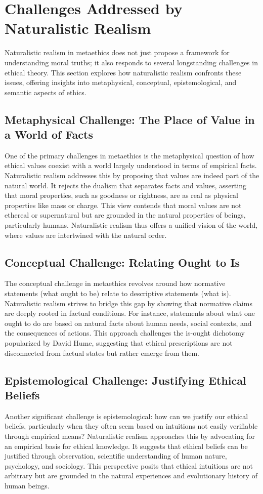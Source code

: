 \documentclass[12pt,a4paper]{article}
\begin{document}
\section{Challenges Addressed by Naturalistic Realism}

Naturalistic realism in metaethics does not just propose a framework for understanding moral truths; it also responds to several longstanding challenges in ethical theory. This section explores how naturalistic realism confronts these issues, offering insights into metaphysical, conceptual, epistemological, and semantic aspects of ethics.

\subsection{Metaphysical Challenge: The Place of Value in a World of Facts}
One of the primary challenges in metaethics is the metaphysical question of how ethical values coexist with a world largely understood in terms of empirical facts. Naturalistic realism addresses this by proposing that values are indeed part of the natural world. It rejects the dualism that separates facts and values, asserting that moral properties, such as goodness or rightness, are as real as physical properties like mass or charge. This view contends that moral values are not ethereal or supernatural but are grounded in the natural properties of beings, particularly humans. Naturalistic realism thus offers a unified vision of the world, where values are intertwined with the natural order.

\subsection{Conceptual Challenge: Relating Ought to Is}
The conceptual challenge in metaethics revolves around how normative statements (what ought to be) relate to descriptive statements (what is). Naturalistic realism strives to bridge this gap by showing that normative claims are deeply rooted in factual conditions. For instance, statements about what one ought to do are based on natural facts about human needs, social contexts, and the consequences of actions. This approach challenges the is-ought dichotomy popularized by David Hume, suggesting that ethical prescriptions are not disconnected from factual states but rather emerge from them.

\subsection{Epistemological Challenge: Justifying Ethical Beliefs}
Another significant challenge is epistemological: how can we justify our ethical beliefs, particularly when they often seem based on intuitions not easily verifiable through empirical means? Naturalistic realism approaches this by advocating for an empirical basis for ethical knowledge. It suggests that ethical beliefs can be justified through observation, scientific understanding of human nature, psychology, and sociology. This perspective posits that ethical intuitions are not arbitrary but are grounded in the natural experiences and evolutionary history of human beings.
\end{document}
